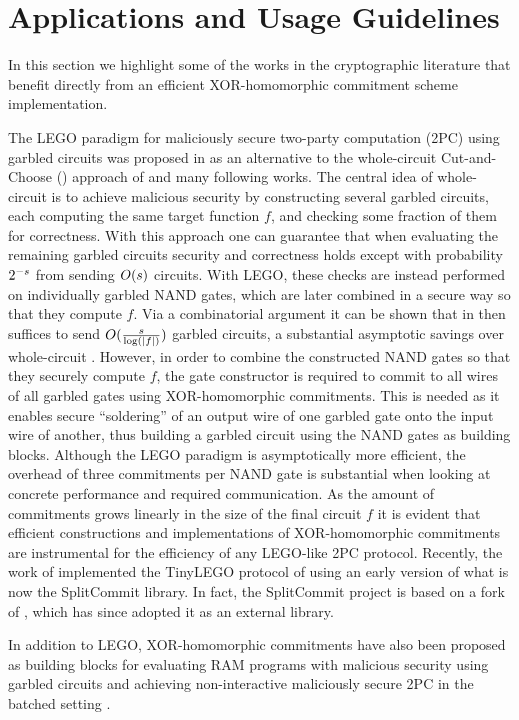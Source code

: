 
\section{Applications and Usage Guidelines}
In this section we highlight some of the works in the cryptographic literature that benefit directly from an efficient XOR-homomorphic commitment scheme implementation.

The LEGO paradigm for maliciously secure two-party computation (2PC) using garbled circuits was proposed in \cite{DBLP:conf/tcc/NielsenO09} as an alternative to the whole-circuit Cut-and-Choose (\CC) approach of \cite{DBLP:conf/eurocrypt/LindellP07} and many following works. The central idea of whole-circuit \CC is to achieve malicious security by constructing several garbled circuits, each computing the same target function $f$, and checking some fraction of them for correctness. With this approach one can guarantee that when evaluating the remaining garbled circuits security and correctness holds except with probability $2^{-s}$ from sending $O(s)$ circuits. With LEGO, these checks are instead performed on individually garbled NAND gates, which are later combined in a secure way so that they compute $f$. Via a combinatorial argument it can be shown that in then suffices to send $O(\frac{s}{\log(|f|)})$ garbled circuits, a substantial asymptotic savings over whole-circuit \CC. However, in order to combine the constructed NAND gates so that they securely compute $f$, the gate constructor is required to commit to all wires of all garbled gates using XOR-homomorphic commitments. This is needed as it enables secure ``soldering'' of an output wire of one garbled gate onto the input wire of another, thus building a garbled circuit using the NAND gates as building blocks. Although the LEGO paradigm is asymptotically more efficient, the overhead of three commitments per NAND gate is substantial when looking at concrete performance and required communication. As the amount of commitments grows linearly in the size of the final circuit $f$ it is evident that efficient constructions and implementations of XOR-homomorphic commitments are instrumental for the efficiency of any LEGO-like 2PC protocol. Recently, the work of \cite{NST17} implemented the TinyLEGO protocol of \cite{DBLP:journals/iacr/FrederiksenJNT15} using an early version of what is now the SplitCommit library. In fact, the SplitCommit project is based on a fork of \cite{NST17}, which has since adopted it as an external library.

In addition to LEGO, XOR-homomorphic commitments have also been proposed as building blocks for evaluating RAM programs with malicious security using garbled circuits \cite{DBLP:conf/eurocrypt/AfsharHMR15} and achieving non-interactive maliciously secure 2PC in the batched setting \cite{DBLP:journals/iacr/MohasselR17}.